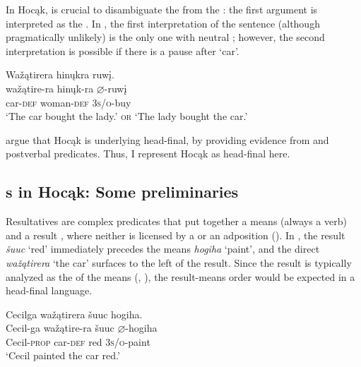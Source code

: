 \documentclass[output=paper]{LSP/langsci}
\begin{document}
In Hocąk,  is crucial to disambiguate the  from the : the first argument is interpreted as the . In , the first interpretation of the sentence (although pragmatically unlikely) is the only one with neutral ; however, the second interpretation is  possible if there is a pause after `car'.

\begin{exe}
\ex\label{ex:rosen:6}
 \glll Wažątirera hinųkra ruwį.\\
wažątire-ra hinųk-ra {$\varnothing$}-ruwį\\
car-\textsc{def} woman-\textsc{def} \textsc{3s/o}-buy\\
\glt `The car bought the lady.' \textsc{or} `The lady bought the car.'

\end{exe}

\citet{JohnsonRosen2014} argue that Hocąk is underlying head-final, by providing evidence from  and postverbal predicates. Thus, I represent Hocąk as head-final here.

\subsection{s in Hocąk: Some preliminaries}

Resultatives are complex predicates that put together a means  (always a verb) and a result , where neither is licensed by a  or an adposition (\citealt{Williams2008}). In , the result \textit{šuuc} `red' immediately precedes the means \textit{hogiha} `paint', and the direct  \textit{wažątirera} `the car' surfaces to the left of the result. Since the result is typically analyzed as the  of the means (\citealt{Li1999}, \citealt{Williams2008}), the result-means order would be expected in a head-final language.

\begin{exe}

\ex \label{ex:rosen:7}\glll Cecilga wažątirera šuuc hogiha. \\
Cecil-ga  wažątire-ra šuuc {$\varnothing$}-hogiha \\
Cecil-\textsc{prop} car-\textsc{def} red \textsc{3s/o}-paint\\
\glt `Cecil painted the car red.'

\end{exe}
\end{document}
